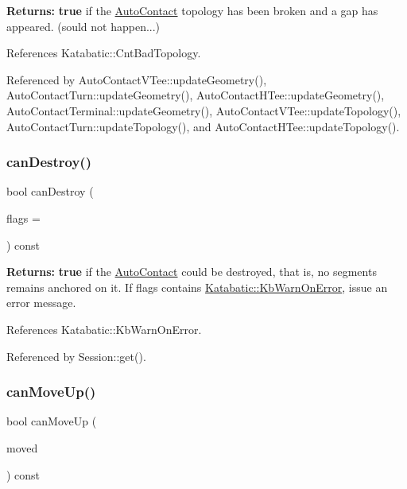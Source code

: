 {\bfseries Returns\+:} {\bfseries true} if the \hyperlink{classKatabatic_1_1AutoContact}{Auto\+Contact} topology has been broken and a gap has appeared. (sould not happen...) 

References Katabatic\+::\+Cnt\+Bad\+Topology.



Referenced by Auto\+Contact\+V\+Tee\+::update\+Geometry(), Auto\+Contact\+Turn\+::update\+Geometry(), Auto\+Contact\+H\+Tee\+::update\+Geometry(), Auto\+Contact\+Terminal\+::update\+Geometry(), Auto\+Contact\+V\+Tee\+::update\+Topology(), Auto\+Contact\+Turn\+::update\+Topology(), and Auto\+Contact\+H\+Tee\+::update\+Topology().

\mbox{\label{classKatabatic_1_1AutoContact_af783b79a1398450e28e2ea55c3eb8476}} 
\subsubsection{\texorpdfstring{can\+Destroy()}{canDestroy()}}
{\footnotesize\ttfamily bool can\+Destroy (\begin{DoxyParamCaption}\item[{unsigned int}]{flags = {} }\end{DoxyParamCaption}) const}

{\bfseries Returns\+:} {\bfseries true} if the \hyperlink{classKatabatic_1_1AutoContact}{Auto\+Contact} could be destroyed, that is, no segments remains anchored on it. If {\ttfamily flags} contains \hyperlink{namespaceKatabatic_a2af2ad6b6441614038caf59d04b3b217aa5153b2cc25ebccca8616ce20ecd727a}{Katabatic\+::\+Kb\+Warn\+On\+Error}, issue an error message. 

References Katabatic\+::\+Kb\+Warn\+On\+Error.



Referenced by Session\+::get().

\mbox{\label{classKatabatic_1_1AutoContact_a69d29e4d230a0111ca18e6e661a48f8b}} 
\subsubsection{\texorpdfstring{can\+Move\+Up()}{canMoveUp()}}
{\footnotesize\ttfamily bool can\+Move\+Up (\begin{DoxyParamCaption}\item[{const \hyperlink{classKatabatic_1_1AutoSegment}{Auto\+Segment} $\ast$}]{moved }\end{DoxyParamCaption}) const}

